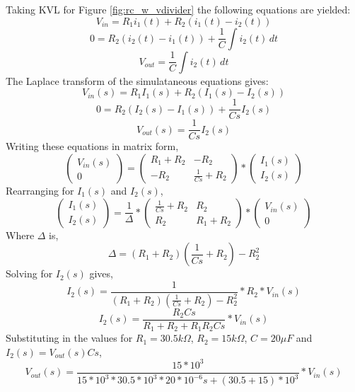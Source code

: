 \documentclass[12pt, a4paper]{article}
\begin{document}
Taking KVL for Figure \ref{fig:rc_w_vdivider} the following equations are yielded:
\[V_{in}=R_1i_1(t)+R_2(i_1(t)-i_2(t))\]
\[0=R_2(i_2(t)-i_1(t))+\frac{1}{C}\int i_2(t) \,dt\]
\[V_{out}=\frac{1}{C}\int i_2(t) \,dt\]
\indent The Laplace transform of the simulataneous equations gives:
\[V_{in}(s)=R_1I_1(s)+R_2(I_1(s)-I_2(s))\]
\[0=R_2(I_2(s)-I_1(s))+\frac{1}{Cs}I_2(s)\]
\[V_{out}(s)=\frac{1}{Cs}I_2(s)\]
\indent Writing these equations in matrix form,
$$
    \begin{pmatrix}
        V_{in}(s) \\
        0 
    \end{pmatrix} =
    \begin{pmatrix}
        R_1+R_2 & -R_2 \\
        -R_2 & \frac{1}{Cs}+R_2
    \end{pmatrix}
    *
    \begin{pmatrix}
        I_1(s) \\
        I_2(s)
    \end{pmatrix}
$$
\indent Rearranging for $I_1(s)$ and $I_2(s)$,
$$
    \begin{pmatrix}
        I_1(s) \\
        I_2(s)
    \end{pmatrix} =
    \frac{1}{\Delta} *
    \begin{pmatrix}
        \frac{1}{Cs}+R_2 & R_2 \\
        R_2 & R_1+R_2
    \end{pmatrix}
    *
    \begin{pmatrix}
        V_{in}(s) \\
        0 
    \end{pmatrix}
$$
\indent Where $\Delta$ is,
$$
    \Delta = (R_1+R_2)(\frac{1}{Cs}+R_2)-R_2^2
$$
\indent Solving for $I_2(s)$ gives,
\[I_2(s)=\frac{1}{(R_1+R_2)(\frac{1}{Cs}+R_2)-R_2^2}*R_2*V_{in}(s)\]                                                                                                                                                                                                                                                                                                                                                                                                                                                                                      
\[I_2(s)=\frac{R_2Cs}{R_1+R_2+R_1R_2Cs}*V_{in}(s)\]
\indent Substituting in the values for $R_1=30.5k\Omega$, $R_2=15k\Omega$, $C=20{\mu}F$ and $I_2(s)=V_{out}(s)Cs$,
\[V_{out}(s)=\frac{15*10^3}{15*10^3*30.5*10^3*20*10^{-6}s+(30.5+15)*10^3}*V_{in}(s)\]
\end{document}
